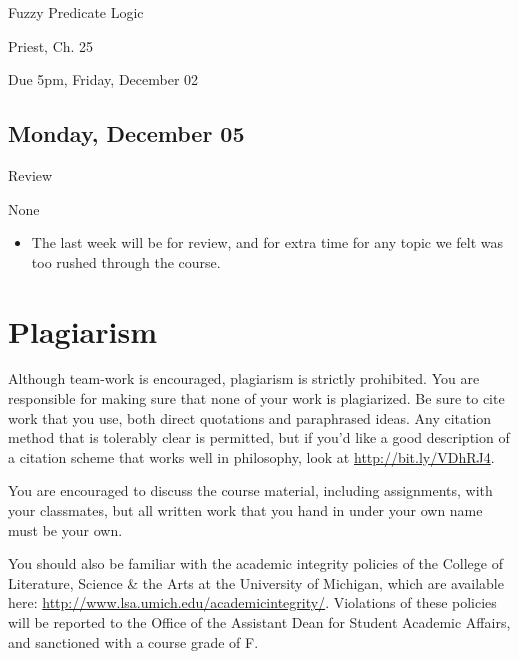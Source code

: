 \documentclass[
]{article}
\providecommand{\tightlist}{%
  \setlength{\itemsep}{0pt}\setlength{\parskip}{0pt}}\usepackage{longtable,booktabs,array}
\begin{document}
\begin{description}
\tightlist
\item[Topic]
Fuzzy Predicate Logic
\item[Required Reading]
Priest, Ch. 25
\item[Weekly Quiz]
Due 5pm, Friday, December 02
\end{description}

\hypertarget{monday-december-05}{%
\subsection{Monday, December 05}\label{monday-december-05}}

\begin{description}
\tightlist
\item[Topic]
Review
\item[Required Reading]
None
\end{description}

\begin{itemize}
\tightlist
\item
  The last week will be for review, and for extra time for any topic we
  felt was too rushed through the course.
\end{itemize}

\hypertarget{plagiarism}{%
\section{Plagiarism}\label{plagiarism}}

Although team-work is encouraged, plagiarism is strictly prohibited. You
are responsible for making sure that none of your work is plagiarized.
Be sure to cite work that you use, both direct quotations and
paraphrased ideas. Any citation method that is tolerably clear is
permitted, but if you'd like a good description of a citation scheme
that works well in philosophy, look at \url{http://bit.ly/VDhRJ4}.

You are encouraged to discuss the course material, including
assignments, with your classmates, but all written work that you hand in
under your own name must be your own.

You should also be familiar with the academic integrity policies of the
College of Literature, Science \& the Arts at the University of
Michigan, which are available here:
\url{http://www.lsa.umich.edu/academicintegrity/}. Violations of these
policies will be reported to the Office of the Assistant Dean for
Student Academic Affairs, and sanctioned with a course grade of F.
\end{document}
